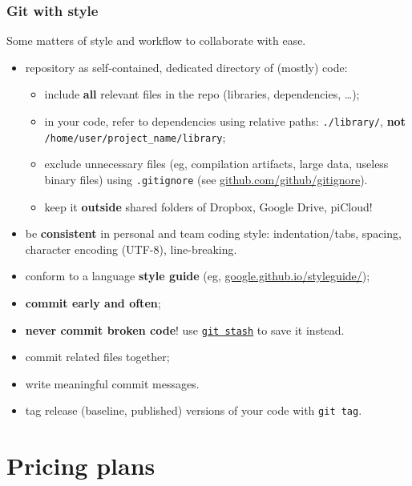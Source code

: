 \documentclass[10pt,svgnames,handout]{beamer}
\begin{document}
\begin{frame}
\label{style}
\frametitle{Git with style}

Some matters of style and workflow to collaborate with ease.

\begin{itemize}[<+->]
\item repository as self-contained, dedicated directory of (mostly) code:
\begin{itemize}
  \item include \textbf{all} relevant files in the repo (libraries, dependencies, \ldots);
  \item in your code, refer to dependencies using relative paths: \lstinline{./library/}, \textbf{not} \lstinline{/home/user/project_name/library};
  \item exclude unnecessary files (eg, compilation artifacts, large data, useless binary files) using \texttt{.gitignore} (see \href{https://github.com/github/gitignore}{github.com/github/gitignore}).
  \item keep it \textbf{outside} shared folders of Dropbox, Google Drive, piCloud!
\end{itemize}
\item be \textbf{consistent} in personal and team coding style: indentation/tabs, spacing, character encoding (UTF-8), line-breaking.
\item conform to a language \textbf{style guide} (eg, \href{https://google.github.io/styleguide/}{google.github.io/styleguide/});
\item \textbf{commit early and often};
\item \textbf{never commit broken code}! use \href{https://git-scm.com/book/it/v2/Git-Tools-Stashing-and-Cleaning}{\lstinline{git stash}} to save it instead.
\item commit related files together;
\item write meaningful commit messages.
\item tag release (baseline, published) versions of your code with \lstinline{git tag}.
\end{itemize}

\end{frame}


\section{Pricing plans}
\end{document}
